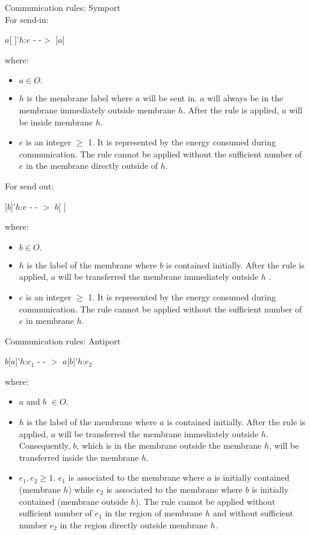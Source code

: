 \documentclass{acm_proc_article-sp}
\begin{document}
	Communication rules: Symport\\
    	For send-in:\\
        \begin{center}
            	$a$[ ]'$h$:$e$ - -$>$ [$a$]
         \end{center}
         	where: \\
         	\begin{itemize}
				\item $a \in O.$ 
                \item $h$ is the membrane label where $a$ will be sent in. $a$ will always be in the membrane immediately outside membrane $h$. After the rule is applied, $a$ will be inside membrane $h$. 
               	\item $e$ is an integer $\geq$ 1. It is represented by the energy consumed during communication. The rule cannot be applied without the sufficient number of $e$ in the membrane directly outside of $h$.
            \end{itemize}

         For send out:\\
         \begin{center}
			[$b$]'$h$:$e$ - - $>$ $b$[ ]     
		\end{center}
        where: \\
        \begin{itemize}
				\item $b \in O.$ 
                \item $h$ is the label of the membrane where $b$ is contained initially. After the rule is applied, $a$ will be transferred the membrane immediately outside $h$ .
                \item $e$ is an integer $\geq$ 1. It is represented by the energy consumed during communication. The rule cannot be applied without the sufficient number of $e$ in membrane $h$.
            \end{itemize}
            
	Communication rules: Antiport 
    	\begin{center}
			$b$[$a$]'$h$:$e_1$ - - $>$ $a$[$b$]'$h$:$e_2$ 
		\end{center}
        where:\\
        	\begin{itemize}
				\item $a$ and $b$ $\in O.$
                \item $h$ is the label of the membrane where $a$ is contained initially. After the rule is applied, $a$ will be transferred the membrane immediately outside $h$. Consequently, $b$, which is in the membrane outside the membrane $h$, will be transferred inside the membrane $h$.
				\item $e_1, e_2 \geq 1$. $e_1$ is associated to the membrane where $a$ is initially contained (membrane $h$) while $e_2$ is associated to the membrane where $b$ is initially contained (membrane outside $h$). The rule cannot be applied without sufficient number of $e_1$ in the region of membrane $h$ and without sufficient number $e_2$ in the region directly outside membrane $h$.
            \end{itemize}    
\end{document}
